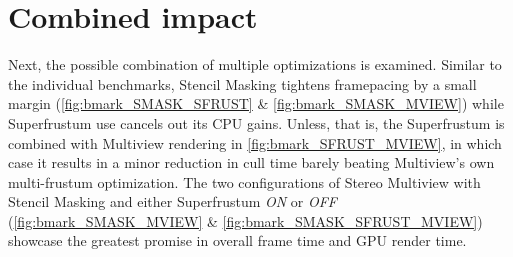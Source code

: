 
\section{Combined impact}
Next, the possible combination of multiple optimizations is examined. Similar to the individual benchmarks, Stencil Masking tightens framepacing by a small margin (\autoref{fig:bmark_SMASK_SFRUST} \& \autoref{fig:bmark_SMASK_MVIEW}) while Superfrustum use cancels out its CPU gains. Unless, that is, the Superfrustum is combined with Multiview rendering in \autoref{fig:bmark_SFRUST_MVIEW}, in which case it results in a minor reduction in cull time barely beating Multiview's own multi-frustum optimization. The two configurations of Stereo Multiview with Stencil Masking and either Superfrustum \textit{ON} or \textit{OFF} (\autoref{fig:bmark_SMASK_MVIEW} \& \autoref{fig:bmark_SMASK_SFRUST_MVIEW}) showcase the greatest promise in overall frame time and GPU render time. 

